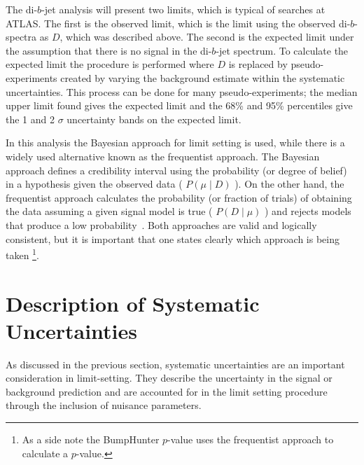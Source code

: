 The di-$b$-jet analysis will present two limits, which is typical of searches at ATLAS.
The first is the observed limit, which is the limit using the observed di-$b$-spectra as $D$, which was described above.
The second is the expected limit under the assumption that there is no signal in the di-$b$-jet spectrum.
To calculate the expected limit the procedure is performed where $D$ is replaced by pseudo-experiments
created by varying the background estimate within the systematic uncertainties.
This process can be done for many pseudo-experiments; the median upper limit found gives the expected limit
and the 68\% and 95\% percentiles give the 1 and 2 $\sigma$ uncertainty bands on the expected limit.

In this analysis the Bayesian approach for limit setting is used,
while there is a widely used alternative known as the frequentist approach.
The Bayesian approach defines a credibility interval using the probability (or degree of belief) in a hypothesis given the observed data ( $P(\mu \mid D)$ ).
On the other hand, the frequentist approach calculates the probability (or fraction of trials)
of obtaining the data assuming a given signal model is true ( $P(D \mid \mu)$ ) and rejects models that produce a low probability~\cite{lim-cowan}.
Both approaches are valid and logically consistent,
but it is important that one states clearly which approach is being taken
\footnote{As a side note the BumpHunter $p$-value uses the frequentist approach to calculate a $p$-value.}.

\section{Description of Systematic Uncertainties}
\label{sec:lim-syst}

As discussed in the previous section,
systematic uncertainties are an important consideration in limit-setting.
They describe the uncertainty in the signal or background prediction
and are accounted for in the limit setting procedure through the inclusion of nuisance parameters.

